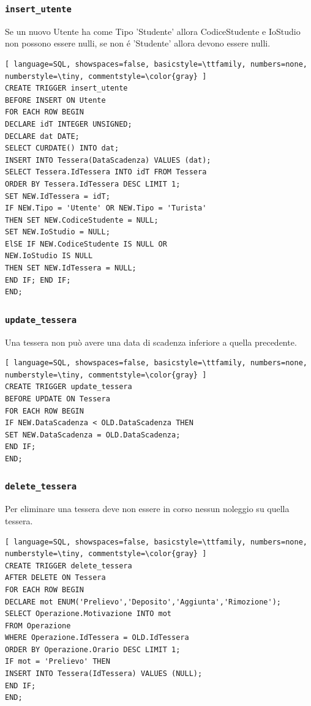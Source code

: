 \documentclass[a4paper,twoside]{article}
\begin{document}
\subsubsection{\texttt{insert\_utente}}
Se un nuovo Utente ha come Tipo 'Studente' allora CodiceStudente e IoStudio non possono essere nulli, se non é 'Studente' allora devono essere nulli.
\begin{lstlisting}[ language=SQL, showspaces=false, basicstyle=\ttfamily, numbers=none, numberstyle=\tiny, commentstyle=\color{gray} ]
CREATE TRIGGER insert_utente
BEFORE INSERT ON Utente
FOR EACH ROW BEGIN
DECLARE idT INTEGER UNSIGNED;
DECLARE dat DATE;
SELECT CURDATE() INTO dat;
INSERT INTO Tessera(DataScadenza) VALUES (dat);
SELECT Tessera.IdTessera INTO idT FROM Tessera
ORDER BY Tessera.IdTessera DESC LIMIT 1;
SET NEW.IdTessera = idT;
IF NEW.Tipo = 'Utente' OR NEW.Tipo = 'Turista'
THEN SET NEW.CodiceStudente = NULL;
SET NEW.IoStudio = NULL;
ElSE IF NEW.CodiceStudente IS NULL OR
NEW.IoStudio IS NULL
THEN SET NEW.IdTessera = NULL;
END IF; END IF;
END;
\end{lstlisting}
\subsubsection{\texttt{update\_tessera}}
Una tessera non può avere una data di scadenza inferiore a quella precedente.
\begin{lstlisting}[ language=SQL, showspaces=false, basicstyle=\ttfamily, numbers=none, numberstyle=\tiny, commentstyle=\color{gray} ]
CREATE TRIGGER update_tessera
BEFORE UPDATE ON Tessera
FOR EACH ROW BEGIN
IF NEW.DataScadenza < OLD.DataScadenza THEN
SET NEW.DataScadenza = OLD.DataScadenza;
END IF;
END;
\end{lstlisting}
\subsubsection{\texttt{delete\_tessera}}
Per eliminare una tessera deve non essere in corso nessun noleggio su quella tessera.
\begin{lstlisting}[ language=SQL, showspaces=false, basicstyle=\ttfamily, numbers=none, numberstyle=\tiny, commentstyle=\color{gray} ]
CREATE TRIGGER delete_tessera
AFTER DELETE ON Tessera
FOR EACH ROW BEGIN
DECLARE mot ENUM('Prelievo','Deposito','Aggiunta','Rimozione');
SELECT Operazione.Motivazione INTO mot
FROM Operazione
WHERE Operazione.IdTessera = OLD.IdTessera
ORDER BY Operazione.Orario DESC LIMIT 1;
IF mot = 'Prelievo' THEN
INSERT INTO Tessera(IdTessera) VALUES (NULL);
END IF;
END;
\end{lstlisting}
\end{document}
